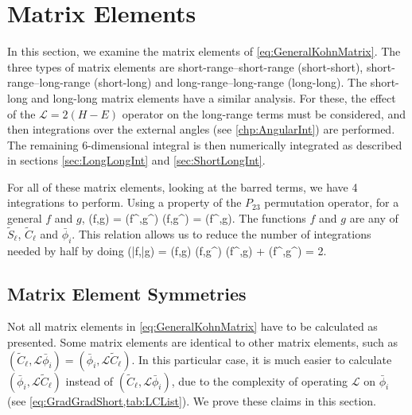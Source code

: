 \documentclass[Dissertation.tex]{subfiles}
\begin{document}
\section{Matrix Elements}
In this section, we examine the matrix elements of \cref{eq:GeneralKohnMatrix}.
The three types of matrix elements are short-range--short-range (short-short),
short-range--long-range (short-long) and long-range--long-range (long-long).
The short-long and long-long matrix elements have a similar analysis. For 
these, the effect of the $\mathcal{L} = 2(H-E)$ operator on the long-range 
terms must be considered, and then integrations over the external angles (see 
\cref{chp:AngularInt}) are performed. The remaining 6-dimensional integral is 
then numerically integrated as described in sections \ref{sec:LongLongInt} 
and \ref{sec:ShortLongInt}.

For all of these matrix elements, looking at the barred terms, we have 4
integrations to perform. Using a property of the $P_{23}$ permutation operator,
for a general $f$ and $g$,
\beq
\label{eq:PermProp}
(f,g) = (f^\prime,g^\prime)  (f,g^\prime) = (f^\prime,g).
\eeq
The functions $f$ and $g$ are any of $\widetilde{S}_\ell$, $\widetilde{C}_\ell$
and $\bar{\phi}_i$. This relation allows us to reduce the number of integrations
needed by half by doing \cite{VanReethThesis}
\beq
\label{eq:PermPropFull}
(\bar{f},\bar{g}) = (f,g) \pm (f,g^\prime) \pm (f^\prime,g) + (f^\prime,g^\prime) = 2.
\eeq


\subsection{Matrix Element Symmetries}
\label{sec:Symmetries}

Not all matrix elements in \cref{eq:GeneralKohnMatrix} have to be calculated 
as presented. Some matrix elements are identical to other matrix elements, 
such as $(\widetilde{C}_\ell,\mathcal{L}\bar{\phi}_i) = (\bar{\phi}_i,\mathcal{L}\widetilde{C}_\ell)$.
In this particular case, it is much easier to 
calculate $(\bar{\phi}_i,\mathcal{L}\widetilde{C}_\ell)$ instead of
$(\widetilde{C}_\ell,\mathcal{L}\bar{\phi}_i)$, due to the complexity of 
operating $\mathcal{L}$ on $\bar{\phi}_i$ (see \cref{eq:GradGradShort,tab:LCList}).
We prove these claims in this section.
\end{document}
